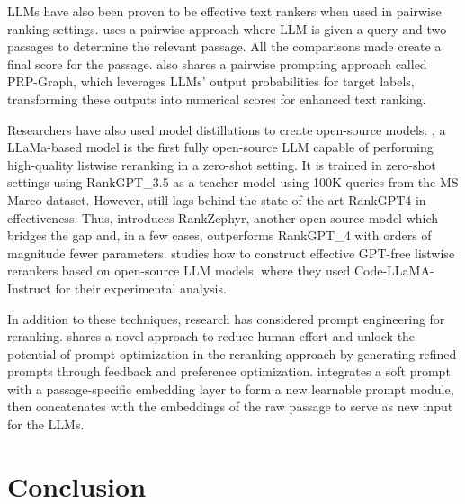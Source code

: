 \documentclass[runningheads]{llncs}
\begin{document}
LLMs have also been proven to be effective text rankers when used in pairwise ranking settings. \cite{huang2024instuprinstructionbasedunsupervised} uses a pairwise approach where LLM is given a query and two passages to determine the relevant passage. All the comparisons made create a final score for the passage. \cite{luo-etal-2024-prp} also shares a pairwise prompting approach called PRP-Graph, which leverages LLMs’ output probabilities for target labels, transforming these outputs into numerical scores for enhanced text ranking.

Researchers have also used model distillations to create open-source models. \cite{pradeep2023rankvicunazeroshotlistwisedocument}, a LLaMa-based model is the first fully open-source LLM capable of performing high-quality listwise reranking in a zero-shot setting. It is trained in zero-shot settings using RankGPT\_{3.5} as a teacher model using 100K queries from the MS Marco dataset. However, \cite{pradeep2023rankvicunazeroshotlistwisedocument} still lags behind the state-of-the-art RankGPT4 in effectiveness. Thus, \cite{pradeep2023rankzephyreffectiverobustzeroshot} introduces RankZephyr, another open source model which bridges the gap and, in a few cases, outperforms RankGPT\_{4} with orders of magnitude fewer parameters. \cite{zhang2023rankwithoutgptbuildinggptindependentlistwise} studies how to construct effective GPT-free listwise rerankers based on open-source LLM models, where they used Code-LLaMA-Instruct\cite{rozière2024codellamaopenfoundation} for their experimental analysis.

In addition to these techniques, research has considered prompt engineering for reranking. \cite{jin2024apeerautomaticpromptengineering} shares a novel approach to reduce human effort and unlock the potential of prompt optimization in the reranking approach by generating refined prompts through feedback and preference optimization. \cite{wu2024passagespecificprompttuningpassage} integrates a soft prompt with a passage-specific embedding layer to form a new learnable prompt module, then concatenates with the embeddings of the raw passage to serve as new input for the LLMs. 

\section{Conclusion}
\end{document}

